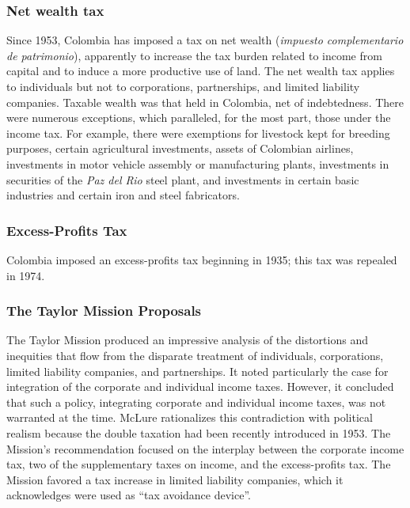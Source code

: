 \documentclass[
  12pt]{article}
\theoremstyle{definition}
\theoremstyle{remark}
\begin{document}
\subsubsection{Net wealth tax}\label{net-wealth-tax}

Since 1953, Colombia has imposed a tax on net wealth (\emph{impuesto
complementario de patrimonio}), apparently to increase the tax burden
related to income from capital and to induce a more productive use of
land. The net wealth tax applies to individuals but not to corporations,
partnerships, and limited liability companies. Taxable wealth was that
held in Colombia, net of indebtedness. There were numerous exceptions,
which paralleled, for the most part, those under the income tax. For
example, there were exemptions for livestock kept for breeding purposes,
certain agricultural investments, assets of Colombian airlines,
investments in motor vehicle assembly or manufacturing plants,
investments in securities of the \emph{Paz del Rio} steel plant, and
investments in certain basic industries and certain iron and steel
fabricators.

\subsubsection{Excess-Profits Tax}\label{excess-profits-tax}

Colombia imposed an excess-profits tax beginning in 1935; this tax was
repealed in 1974.

\subsubsection{The Taylor Mission
Proposals}\label{the-taylor-mission-proposals}

The Taylor Mission produced an impressive analysis of the distortions
and inequities that flow from the disparate treatment of individuals,
corporations, limited liability companies, and partnerships. It noted
particularly the case for integration of the corporate and individual
income taxes. However, it concluded that such a policy, integrating
corporate and individual income taxes, was not warranted at the time.
McLure rationalizes this contradiction with political realism because
the double taxation had been recently introduced in 1953. The Mission's
recommendation focused on the interplay between the corporate income
tax, two of the supplementary taxes on income, and the excess-profits
tax. The Mission favored a tax increase in limited liability companies,
which it acknowledges were used as ``tax avoidance device''.
\end{document}
